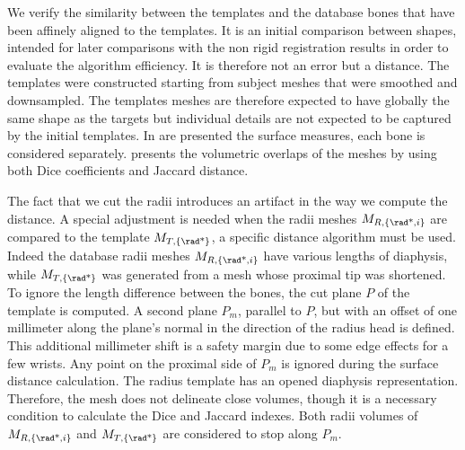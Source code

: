 We verify the similarity between the templates \mt* and the database bones \mr* that have been affinely aligned to the templates. It is an initial comparison between shapes, intended for later comparisons with the non rigid registration results in order to evaluate the algorithm efficiency. It is therefore not an error but a distance. The templates were constructed starting from subject meshes that were smoothed and downsampled. The templates meshes are therefore expected to have globally the same shape as the targets but individual details are not expected to be captured by the initial templates.
In  are presented the surface measures, each bone is considered separately.  presents the volumetric overlaps of the meshes by using both Dice coefficients and Jaccard distance. 

The fact that we cut the radii introduces an artifact in the way we compute the distance. A special adjustment is needed when the radii meshes $M_{R,\{\text{\rad*},i\}}$ are compared to the template $M_{T,\{\text{\rad*}\}}$, a specific distance algorithm must be used. Indeed the database radii meshes $M_{R,\{\text{\rad*},i\}}$ have various lengths of diaphysis, while $M_{T,\{\text{\rad*}\}}$ was generated from a mesh whose proximal tip was shortened. To ignore the length difference between the bones, the cut plane $P$ of the template is computed. A second plane $P_m$, parallel to $P$, but with an offset of one millimeter along the plane's normal in the direction of the radius head is defined. This additional millimeter shift is a safety margin due to some edge effects for a few wrists. Any point on the proximal side of $P_m$ is ignored during the surface distance calculation. The radius template has an opened diaphysis representation. Therefore, the mesh does not delineate close volumes, though it is a necessary condition to calculate the Dice and Jaccard indexes. Both radii volumes of $M_{R,\{\text{\rad*},i\}}$ and $M_{T,\{\text{\rad*}\}}$ are considered to stop along $P_m$. 




